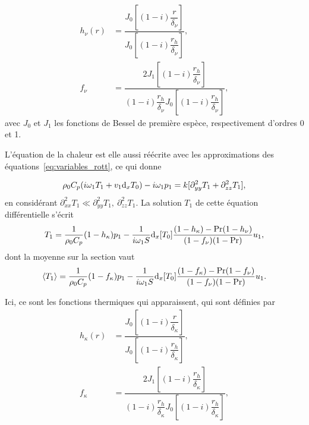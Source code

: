 \begin{subequations}
		\begin{align}
			h_\nu(r) &= \dfrac{J_0\left[(1-i)\dfrac{r}{\delta_\nu}\right]}{J_0\left[(1-i)\dfrac{r_h}{\delta_\nu}\right]},
			\label{eq:FonctionViqueuse_r} \\
			f_\nu &= \dfrac{2J_1\left[(1-i)\dfrac{r_h}{\delta_\nu}\right]}{(1-i)\dfrac{r_h}{\delta_\nu}J_0\left[(1-i)\dfrac{r_h}{\delta_\nu}\right]},
			\label{eq:FonctionViqueuse_Moyenne}
		\end{align}
		\label{eq:FonctionsVisqueuses}
\end{subequations}
avec $J_0$ et $J_1$ les fonctions de Bessel de première espèce, respectivement d'ordres \num{0} et \num{1}.\smallskip

L'équation de la chaleur est elle aussi réécrite avec les approximations des équations~\eqref{eq:variables_rott}, ce qui donne

\begin{equation}
	\rho_0 C_p (i\omega_1 T_1 + v_1\mathrm{d}_x T_0) - i\omega_1 p_1 = k[\partial^2_{yy} T_1 + \partial^2_{zz}T_1],
\end{equation}
en considérant $\partial_{xx}^2 T_1 \ll \partial_{yy}^2 T_1,~\partial_{zz}^2 T_1$. La solution $T_1$ de cette équation différentielle s'écrit
\begin{equation}
	T_1=\frac{1}{\rho_0 C_p}(1-h_\kappa)p_1 - \frac{1}{i \omega_1 S} \mathrm{d}_x [T_0] \frac{(1-h_\kappa) - \mathrm{Pr}(1-h_\nu)}{(1-f_\nu)(1-\mathrm{Pr})}u_1,
\end{equation}
dont la moyenne sur la section vaut
\begin{equation}
	\left\langle T_1 \right\rangle=\frac{1}{\rho_0 C_p}(1-f_\kappa)p_1 - \frac{1}{i \omega_1 S} \mathrm{d}_x [T_0] \frac{(1-f_\kappa) - \mathrm{Pr}(1-f_\nu)}{(1-f_\nu)(1-\mathrm{Pr})}u_1.
	\label{eq:T_1_moyenne_fkappa}
\end{equation}

Ici, ce sont les fonctions thermiques qui apparaissent, qui sont définies par
\begin{subequations}
		\begin{align}
			h_\kappa(r) &= \dfrac{J_0\left[(1-i)\dfrac{r}{\delta_\kappa}\right]}{J_0\left[(1-i)\dfrac{r_h}{\delta_\kappa}\right]},
			\label{eq:FonctionThermique_k} \\
			f_\kappa &= \dfrac{2J_1\left[(1-i)\dfrac{r_h}{\delta_\kappa}\right]}{(1-i)\dfrac{r_h}{\delta_\kappa}J_0\left[(1-i)\dfrac{r_h}{\delta_\kappa}\right]},
			\label{eq:FonctionThermique_Moyenne}
		\end{align}
		\label{eq:FonctionsThermiques}
\end{subequations}

